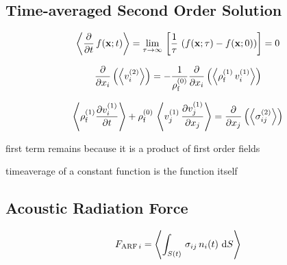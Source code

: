\subsection{Time-averaged Second Order Solution\label{Th-avg-nd-order}}

\begin{equation}
  \left\langle \pdv{t}\,f(\vb{x};t) \right\rangle = \lim\limits_{\tau \rightarrow \infty}{\,
    \left[ \frac{1}{\tau}\,\left( f(\vb{x}; \tau) - f(\vb{x}; 0) \right) 
  \right]} = 0
  \label{eq:Th-avg-property}
\end{equation}


\begin{equation}
  \pdv{x_{i}}\left( \left\langle v_{i}^{(2)} \right\rangle \right) = 
  -\frac{1}{\rho_{\mathrm{f}}^{(0)}} \pdv{x_{i}}\left(\left\langle  
  \rho_{\mathrm{f}}^{(1)}\,v_{i}^{(1)}  \right\rangle\right)
  \label{eq:Th-avg-massconservatio}
\end{equation}

\begin{equation}
  \left\langle \rho_{\mathrm{f}}^{(1)} \pdv{  v_{i}^{(1)}  }{t} \right\rangle + 
  \rho_{\mathrm{f}}^{(0)}\,\left\langle v_{j}^{(1)}\,\pdv{  v_{j}^{(1)}  }{x_{j}} \right\rangle 
  = \pdv{x_{j}}\left( \left\langle \sigma_{ij}^{(2)} \right\rangle \right)
  \label{eq:Th-avg-navier}
\end{equation}

first term remains because it is a product of first order fields

timeaverage of a constant function is the function itself

\subsection{Acoustic Radiation Force\label{sec:Th-ARF}}

\begin{equation}
  F_{\mathrm{ARF}\,i} = \left\langle \int_{S(t)}\,\sigma_{ij}\,n_{i}(t)\,\dd{S} \right\rangle
  \label{eq:Th-def-ARF}
\end{equation}

